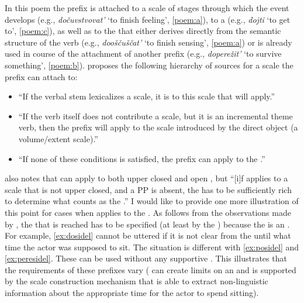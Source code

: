 In this poem the prefix  is attached to a scale of stages through which the event develops (e.g., \textit{do\v{c}uvstvovat'} `to finish feeling', \ref{poem:a}), to a  (e.g., \textit{dojti} `to get to', \ref{poem:c}), as well as to the  that either derives directly from the semantic structure of the verb (e.g., \textit{doo\v{s}\v{c}u\v{s}\v{c}at'} `to finish sensing', \ref{poem:a}) or is already used in course of the attachment of another prefix (e.g., \textit{dopere\v{z}it'} `to survive something', \ref{poem:b}). \citet{Kagan:book} proposes the following hierarchy of sources for a scale the prefix  can attach to: 

\begin{itemize}
\item ``If the verbal stem lexicalizes a scale, it is to this scale that  will apply.''
\item ``If the verb itself does not contribute a scale, but it is an incremental
theme verb, then the prefix will apply to the scale introduced by the direct object (a volume/extent scale).''
\item ``If none of these conditions is satisfied, the prefix can apply to the .''
\end{itemize}

\citet{Kagan:12} also notes that  can apply to both upper closed and open , but ``[i]f  applies to a scale that is not upper closed, and a PP is absent, the  has to be sufficiently rich to determine what counts as the .'' I would like to provide one more illustration of this point for cases when  applies to the . As follows from the observations made by \citet{Kagan:12}, the  that is reached has to be specified (at least by the ) because the  is an . For example, \ref{ex:dosidel} cannot be uttered if it is not clear from the  until what time the actor was supposed to sit. The situation is different with \ref{ex:posidel} and \ref{ex:peresidel}. These can be used without any supportive . This illustrates that the requirements of these prefixes vary ( can create limits on an  and  is supported by the scale construction mechanism that is able to extract non-linguistic information about the appropriate time for the actor to spend sitting).

